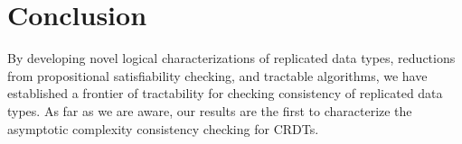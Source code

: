 \section{Conclusion}
\label{sec:conclusion}

By developing novel logical characterizations of replicated data types, reductions from propositional satisfiability checking, and tractable algorithms, we have established a frontier of tractability for checking consistency of replicated data types. As far as we are aware, our results are the first to characterize the asymptotic complexity consistency checking for CRDTs.
